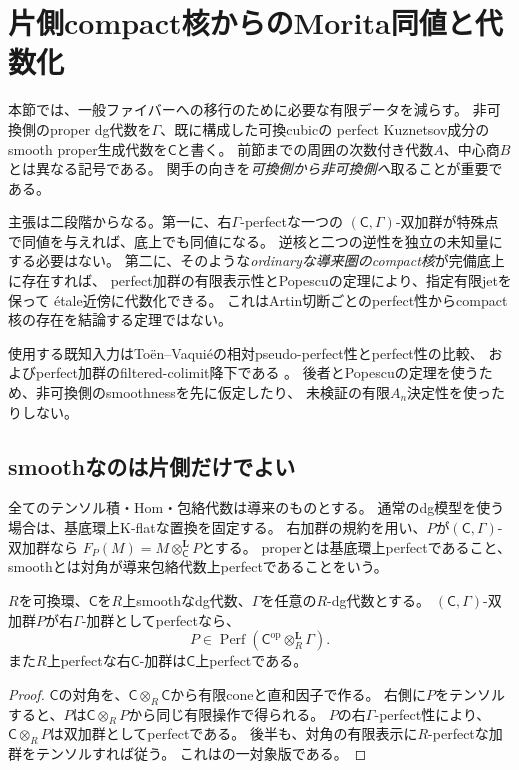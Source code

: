 \section{片側compact核からのMorita同値と代数化}
\label{os:sec:algebraization}

本節では、一般ファイバーへの移行のために必要な有限データを減らす。
非可換側のproper dg代数を$\Gamma$、既に構成した可換cubicの
perfect Kuznetsov成分のsmooth proper生成代数を$\mathsf C$と書く。
前節までの周囲の次数付き代数$A$、中心商$B$とは異なる記号である。
関手の向きを\emph{可換側から非可換側へ}取ることが重要である。

主張は二段階からなる。第一に、右$\Gamma$-perfectな一つの
$(\mathsf C,\Gamma)$-双加群が特殊点で同値を与えれば、底上でも同値になる。
逆核と二つの逆性を独立の未知量にする必要はない。
第二に、そのような\emph{ordinaryな導来圏のcompact核}が完備底上に存在すれば、
perfect加群の有限表示性とPopescuの定理により、指定有限jetを保って
\'etale近傍に代数化できる。
これはArtin切断ごとのperfect性からcompact核の存在を結論する定理ではない。

使用する既知入力はTo\"en--Vaqui\'eの相対pseudo-perfect性とperfect性の比較、
およびperfect加群のfiltered-colimit降下である
\cite[Lemma~2.8, Lemma~2.10]{OSTV}。
後者とPopescuの定理を使うため、非可換側のsmoothnessを先に仮定したり、
未検証の有限$A_n$決定性を使ったりしない。

\subsection{smoothなのは片側だけでよい}

全てのテンソル積・Hom・包絡代数は導来のものとする。
通常のdg模型を使う場合は、基底環上K-flatな置換を固定する。
右加群の規約を用い、$P$が$(\mathsf C,\Gamma)$-双加群なら
$F_P(M)=M\otimes_{\mathsf C}^{\mathbf L}P$とする。
properとは基底環上perfectであること、smoothとは対角が導来包絡代数上perfectであることをいう。

\begin{lemma}[片側perfectから双加群perfectへ]\label{os:lem:compact}
$R$を可換環、$\mathsf C$を$R$上smoothなdg代数、$\Gamma$を任意の$R$-dg代数とする。
$(\mathsf C,\Gamma)$-双加群$P$が右$\Gamma$-加群としてperfectなら、
\[
 P\in\operatorname{Perf}(\mathsf C^{\mathrm{op}}\otimes_R^{\mathbf L}\Gamma).
 \tag{OS1}\label{os:eq:compact}
\]
また$R$上perfectな右$\mathsf C$-加群は$\mathsf C$上perfectである。
\end{lemma}
\begin{proof}
$\mathsf C$の対角を、$\mathsf C\otimes_R\mathsf C$から有限coneと直和因子で作る。
右側に$P$をテンソルすると、$P$は$\mathsf C\otimes_R P$から同じ有限操作で得られる。
$P$の右$\Gamma$-perfect性により、$\mathsf C\otimes_R P$は双加群としてperfectである。
後半も、対角の有限表示に$R$-perfectな加群をテンソルすれば従う。
これは\cite[Lemma~2.8(2)]{OSTV}の一対象版である。
\end{proof}

